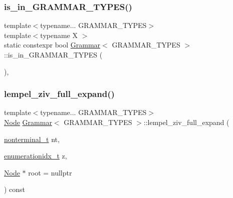 \subsubsection{\texorpdfstring{is\+\_\+in\+\_\+\+G\+R\+A\+M\+M\+A\+R\+\_\+\+T\+Y\+P\+E\+S()}{is\_in\_GRAMMAR\_TYPES()}}
{\footnotesize\ttfamily template$<$typename... G\+R\+A\+M\+M\+A\+R\+\_\+\+T\+Y\+P\+ES$>$ \\
template$<$typename X $>$ \\
static constexpr bool \hyperlink{class_grammar}{Grammar}$<$ G\+R\+A\+M\+M\+A\+R\+\_\+\+T\+Y\+P\+ES $>$\+::is\+\_\+in\+\_\+\+G\+R\+A\+M\+M\+A\+R\+\_\+\+T\+Y\+P\+ES (\begin{DoxyParamCaption}{ }\end{DoxyParamCaption})\hspace{0.3cm}{\ttfamily [inline]}, {\ttfamily [static]}}

\mbox{\label{class_grammar_adea898b27f2cf76417e4b686c1045e54}} 
\subsubsection{\texorpdfstring{lempel\+\_\+ziv\+\_\+full\+\_\+expand()}{lempel\_ziv\_full\_expand()}\hspace{0.1cm}{\footnotesize\ttfamily [1/2]}}
{\footnotesize\ttfamily template$<$typename... G\+R\+A\+M\+M\+A\+R\+\_\+\+T\+Y\+P\+ES$>$ \\
\hyperlink{class_node}{Node} \hyperlink{class_grammar}{Grammar}$<$ G\+R\+A\+M\+M\+A\+R\+\_\+\+T\+Y\+P\+ES $>$\+::lempel\+\_\+ziv\+\_\+full\+\_\+expand (\begin{DoxyParamCaption}\item[{\hyperlink{_nonterminal_8h_a5c1f658dc7560600a16d22408bd716ca}{nonterminal\+\_\+t}}]{nt,  }\item[{\hyperlink{_numerics_8h_a9fe2bbca873b046b2bd276fc6856bb88}{enumerationidx\+\_\+t}}]{z,  }\item[{\hyperlink{class_node}{Node} $\ast$}]{root = {\ttfamily nullptr} }\end{DoxyParamCaption}) const\hspace{0.3cm}{\ttfamily [inline]}}

\mbox{\label{class_grammar_a37ccd1307ac9cb13a9653ba6c2134498}} 
